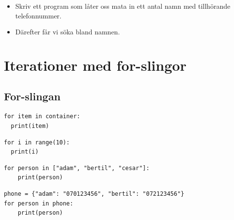 \begin{frame}[fragile]
  \begin{example}[isin.py]
    \inputminted{python}{examples/isin-alt.py}
  \end{example}
\end{frame}

\begin{frame}[fragile]
  \begin{exercise}[search.py]
    \begin{itemize}
      \item Skriv ett program som låter oss mata in ett antal namn med 
        tillhörande telefonnummer.
      \item Därefter får vi söka bland namnen.
    \end{itemize}
  \end{exercise}
\end{frame}


\section{Iterationer med for-slingor}

\subsection{For-slingan}

\begin{frame}[fragile]
  \begin{verbatim}
for item in container:
  print(item)
  \end{verbatim}
\end{frame}

\begin{frame}[fragile]
  \begin{example}
    \begin{verbatim}
for i in range(10):
  print(i)
    \end{verbatim}
  \end{example}

  \begin{example}
    \begin{verbatim}
for person in ["adam", "bertil", "cesar"]:
    print(person)
    \end{verbatim}
  \end{example}

  \begin{example}
    \begin{verbatim}
phone = {"adam": "070123456", "bertil": "072123456"}
for person in phone:
    print(person)
    \end{verbatim}
  \end{example}
\end{frame}


